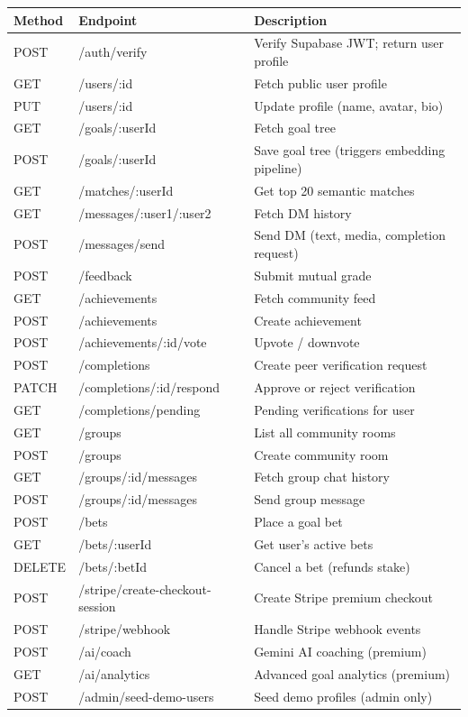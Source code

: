 \documentclass[11pt,a4paper]{article}
\begin{document}
\begin{center}
\begin{longtable}{llp{8cm}}
\toprule
\textbf{Method} & \textbf{Endpoint} & \textbf{Description} \\
\midrule
\endhead
POST & /auth/verify & Verify Supabase JWT; return user profile \\
GET  & /users/:id & Fetch public user profile \\
PUT  & /users/:id & Update profile (name, avatar, bio) \\
GET  & /goals/:userId & Fetch goal tree \\
POST & /goals/:userId & Save goal tree (triggers embedding pipeline) \\
GET  & /matches/:userId & Get top 20 semantic matches \\
GET  & /messages/:user1/:user2 & Fetch DM history \\
POST & /messages/send & Send DM (text, media, completion request) \\
POST & /feedback & Submit mutual grade \\
GET  & /achievements & Fetch community feed \\
POST & /achievements & Create achievement \\
POST & /achievements/:id/vote & Upvote / downvote \\
POST & /completions & Create peer verification request \\
PATCH & /completions/:id/respond & Approve or reject verification \\
GET  & /completions/pending & Pending verifications for user \\
GET  & /groups & List all community rooms \\
POST & /groups & Create community room \\
GET  & /groups/:id/messages & Fetch group chat history \\
POST & /groups/:id/messages & Send group message \\
POST & /bets & Place a goal bet \\
GET  & /bets/:userId & Get user's active bets \\
DELETE & /bets/:betId & Cancel a bet (refunds stake) \\
POST & /stripe/create-checkout-session & Create Stripe premium checkout \\
POST & /stripe/webhook & Handle Stripe webhook events \\
POST & /ai/coach & Gemini AI coaching (premium) \\
GET  & /ai/analytics & Advanced goal analytics (premium) \\
POST & /admin/seed-demo-users & Seed demo profiles (admin only) \\
\bottomrule
\end{longtable}
\end{center}
\end{document}
